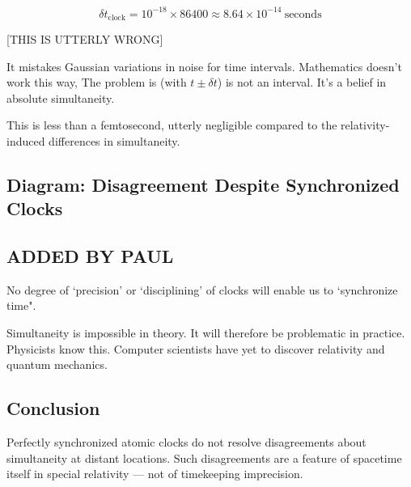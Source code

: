 \begin{equation}
\delta t_{\text{clock}} = 10^{-18} \times 86400 \approx 8.64 \times 10^{-14}\ \text{seconds}
\end{equation}

[THIS IS UTTERLY WRONG]

It mistakes Gaussian variations in noise for time intervals. Mathematics doesn't work this way, The problem is (with $t \pm \delta t$) is not an interval. It's a belief in absolute simultaneity.  

This is less than a femtosecond, utterly negligible compared to the relativity-induced differences in simultaneity.

\subsection{Diagram: Disagreement Despite Synchronized Clocks}

\begin{marginfigure}
\centering
{}
\caption{Two observers, A and B, with synchronized clocks, disagree on what event in Andromeda is simultaneous with their current time.}
\end{marginfigure}

\subsection{ADDED BY PAUL}

No degree of `precision' or `disciplining' of clocks will enable us to  `synchronize time". 

Simultaneity is impossible in theory. It will therefore be problematic  in practice.  Physicists know this. Computer scientists have yet to discover relativity and quantum mechanics. 

\subsection{Conclusion}

Perfectly synchronized atomic clocks do not resolve disagreements about simultaneity at distant locations. Such disagreements are a feature of spacetime itself in special relativity — not of timekeeping imprecision.